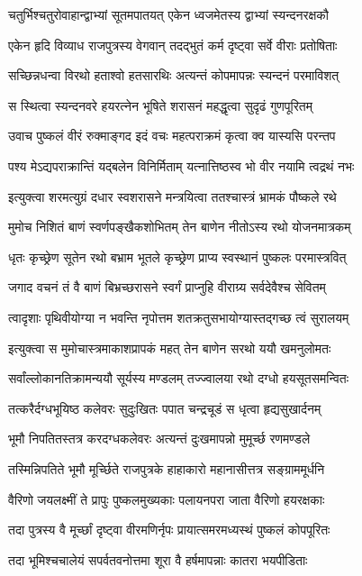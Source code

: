 \twolineshloka
{चतुर्भिश्चतुरोवाहान्द्वाभ्यां सूतमपातयत्}
{एकेन ध्वजमेतस्य द्वाभ्यां स्यन्दनरक्षकौ}%

\twolineshloka
{एकेन हृदि विव्याध राजपुत्रस्य वेगवान्}
{तदद्भुतं कर्म दृष्ट्वा सर्वे वीराः प्रतोषिताः}%

\twolineshloka
{सच्छिन्नधन्वा विरथो हताश्वो हतसारथिः}
{अत्यन्तं कोपमापन्नः स्यन्दनं परमाविशत्}%

\twolineshloka
{स स्थित्वा स्यन्दनवरे हयरत्नेन भूषिते}
{शरासनं महद्धृत्वा सुदृढं गुणपूरितम्}%

\twolineshloka
{उवाच पुष्कलं वीरं रुक्माङ्गद इदं वचः}
{महत्पराक्रमं कृत्वा क्व यास्यसि परन्तप}%

\twolineshloka
{पश्य मेऽद्यपराक्रान्तिं यद्बलेन विनिर्मिताम्}
{यत्नात्तिष्ठस्व भो वीर नयामि त्वद्रथं नभः}%

\twolineshloka
{इत्युक्त्वा शरमत्युग्रं दधार स्वशरासने}
{मन्त्रयित्वा ततश्चास्त्रं भ्रामकं पौष्कले रथे}%

\twolineshloka
{मुमोच निशितं बाणं स्वर्णपङ्खैकशोभितम्}
{तेन बाणेन नीतोऽस्य रथो योजनमात्रकम्}%

\twolineshloka
{धृतः कृच्छ्रेण सूतेन रथो बभ्राम भूतले}
{कृच्छ्रेण प्राप्य स्वस्थानं पुष्कलः परमास्त्रवित्}%

\twolineshloka
{जगाद वचनं तं वै बाणं बिभ्रच्छरासने}
{स्वर्गं प्राप्नुहि वीराग्र्य सर्वदेवैश्च सेवितम्}%

\twolineshloka
{त्वादृशाः पृथिवीयोग्या न भवन्ति नृपोत्तम}
{शतक्रतुसभायोग्यास्तद्गच्छ त्वं सुरालयम्}%

\twolineshloka
{इत्युक्त्वा स मुमोचास्त्रमाकाशप्रापकं महत्}
{तेन बाणेन सरथो ययौ खमनुलोमतः}%

\twolineshloka
{सर्वांल्लोकानतिक्रामन्ययौ सूर्यस्य मण्डलम्}
{तज्ज्वालया रथो दग्धो हयसूतसमन्वितः}%

\twolineshloka
{तत्करैर्दग्धभूयिष्ठ कलेवरः सुदुःखितः}
{पपात चन्द्रचूडं स धृत्वा हृद्यसुखार्दनम्}%

\twolineshloka
{भूमौ निपतितस्तत्र करदग्धकलेवरः}
{अत्यन्तं दुःखमापन्नो मुमूर्च्छ रणमण्डले}%

\twolineshloka
{तस्मिन्निपतिते भूमौ मूर्च्छिते राजपुत्रके}
{हाहाकारो महानासीत्तत्र सङ्ग्राममूर्धनि}%

\twolineshloka
{वैरिणो जयलक्ष्मीं ते प्रापुः पुष्कलमुख्यकाः}
{पलायनपरा जाता वैरिणो हयरक्षकाः}%

\twolineshloka
{तदा पुत्रस्य वै मूर्च्छां दृष्ट्वा वीरमणिर्नृपः}
{प्रायात्समरमध्यस्थं पुष्कलं कोपपूरितः}%

\twolineshloka
{तदा भूमिश्चचालेयं सपर्वतवनोत्तमा}
{शूरा वै हर्षमापन्नाः कातरा भयपीडिताः}%

